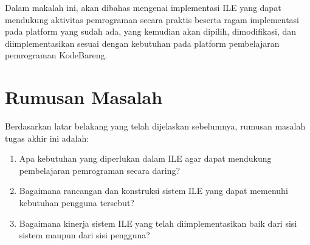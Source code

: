 Dalam makalah ini, akan dibahas mengenai implementasi ILE yang dapat mendukung aktivitas pemrograman secara praktis beserta ragam implementasi pada platform yang sudah ada, yang kemudian akan dipilih, dimodifikasi, dan diimplementasikan sesuai dengan kebutuhan pada platform pembelajaran pemrograman KodeBareng.




\section{Rumusan Masalah}
Berdasarkan latar belakang yang telah dijelaskan sebelumnya, rumusan masalah tugas akhir ini adalah:

\begin{enumerate}
    \item Apa kebutuhan yang diperlukan dalam ILE agar dapat mendukung pembelajaran pemrograman secara daring?
    \item Bagaimana rancangan dan konstruksi sistem ILE yang dapat memenuhi kebutuhan pengguna tersebut?
    \item Bagaimana kinerja sistem ILE yang telah diimplementasikan baik dari sisi sistem maupun dari sisi pengguna?
\end{enumerate}

